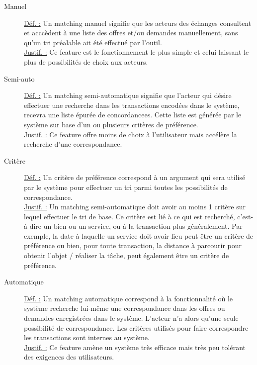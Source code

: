\begin{description}
\item [Manuel]
\underline{Déf. :}  Un matching manuel signifie que les acteurs des échanges consultent et acccèdent à une liste des offres et/ou demandes manuellement,  sans qu'un tri préalable ait été effectué par l'outil.
\\ \underline{Justif. :} Ce feature est le fonctionnement le plus simple et celui laissant le plus de possibilités de choix aux acteurs. 
\newline

\item [Semi-auto]
\underline{Déf. :}  Un matching semi-automatique signifie que l'acteur qui désire effectuer une recherche dans les transactions encodées dans le système,  recevra une liste épurée de concordancees.  Cette liste est générée par le système sur base d'un ou plusieurs critères de préférence.
\\ \underline{Justif. :}  Ce feature offre moins de choix à l'utilisateur mais accélère la recherche d'une correspondance.
\newline

\item [Critère]
\underline{Déf. :}  Un critère de préférence correspond à un argument qui sera utilisé par le système pour effectuer un tri parmi toutes les possibilités de correspondance.
\\ \underline{Justif. :}  Un matching semi-automatique doit avoir au moins 1 critère sur lequel effectuer le tri de base.  Ce critère est lié à ce qui est recherché,  c'est-à-dire un bien ou un service,  ou à la transaction plus généralement.  Par exemple,  la date à laquelle un service doit avoir lieu peut être un critère de préférence ou bien,  pour toute transaction,  la distance à parcourir pour obtenir l'objet / réaliser la tâche,  peut également être un critère de préférence.   
\newline

\item [Automatique]
\underline{Déf. :}  Un matching automatique correspond à la fonctionnalité où le système recherche lui-même une correspondance dans les offres ou demandes enregistrées dans le système.  L'acteur n'a alors qu'une seule possibilité de correspondance.  Les critères utilisés pour faire correspondre les transactions sont internes au système.
\\ \underline{Justif. :}  Ce feature amène un système très efficace mais très peu tolérant des exigences des utilisateurs.  
\newline


\end{description}
